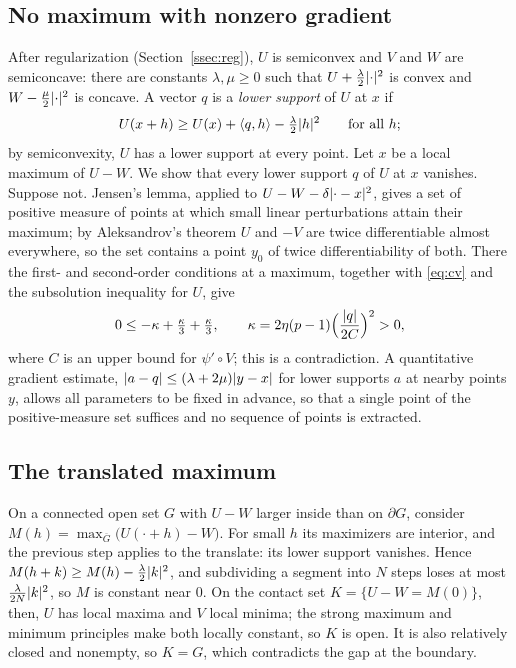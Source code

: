 \documentclass[11pt,reqno]{amsart}
\DeclarePairedDelimiter{\abs}{\lvert}{\rvert}
\theoremstyle{plain}
\theoremstyle{definition}
\theoremstyle{remark}
\begin{document}
\subsection{No maximum with nonzero gradient}
After regularization (Section~\ref{ssec:reg}), $U$ is semiconvex and $V$ and
$W$ are semiconcave: there are constants $\lambda, \mu \ge 0$ such that
$U + \frac\lambda2\abs{\cdot}^2$ is convex and $W - \frac\mu2\abs{\cdot}^2$ is
concave. A vector $q$ is a \emph{lower support} of $U$ at $x$ if
\[
  U(x + h) \ge U(x) + \langle q, h\rangle - \tfrac\lambda2\abs h^2
  \qquad\text{for all } h;
\]
by semiconvexity, $U$ has a lower support at every point. Let $x$ be a
local maximum of $U - W$. We show that every lower support $q$ of $U$ at $x$
vanishes. Suppose not. Jensen's lemma, applied
to $U - W - \delta\abs{\cdot - x}^2$, gives a set of positive measure of points
at which small linear perturbations attain their maximum; by Aleksandrov's
theorem $U$ and $-V$ are twice differentiable almost everywhere, so the set
contains a point $y_0$ of twice differentiability of both. There the
first- and second-order conditions at a maximum, together with
\eqref{eq:cv} and the subsolution inequality for $U$, give
\[
  0 \le -\kappa + \tfrac{\kappa}{3} + \tfrac{\kappa}{3},
  \qquad \kappa = 2\eta(p-1)\Bigl(\frac{\abs q}{2C}\Bigr)^2 > 0,
\]
where $C$ is an upper bound for $\psi' \circ V$; this is a contradiction. A
quantitative gradient estimate, $\abs{a - q} \le (\lambda + 2\mu)\abs{y - x}$
for lower supports $a$ at nearby points $y$, allows all parameters to be fixed
in advance, so that a single point of the positive-measure set suffices and
no sequence of points is extracted.

\subsection{The translated maximum}
On a connected open set $G$ with $U - W$ larger inside than on $\partial G$,
consider $M(h) = \max_{\overline G}\bigl(U(\cdot + h) - W\bigr)$. For small $h$
its maximizers are interior, and the previous step applies to the translate:
its lower support vanishes. Hence $M(h + k) \ge M(h) - \frac\lambda2\abs k^2$,
and subdividing a segment into $N$ steps loses at most
$\frac{\lambda}{2N}\abs k^2$, so $M$ is constant near $0$. On the contact set
$K = \{U - W = M(0)\}$, then, $U$ has local maxima and $V$ local minima; the
strong maximum and minimum principles make both locally constant, so $K$ is
open. It is also relatively closed and nonempty, so $K = G$, which contradicts
the gap at the boundary.
\end{document}
